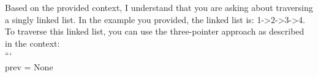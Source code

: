 \documentclass[preview]{standalone}
\begin{document}
Based on the provided context, I understand that you are asking about traversing a singly linked list. In the example you provided, the linked list is: 1->2->3->4. To traverse this linked list, you can use the three-pointer approach as described in the context:\\```\\prev = None\\
\end{document}
